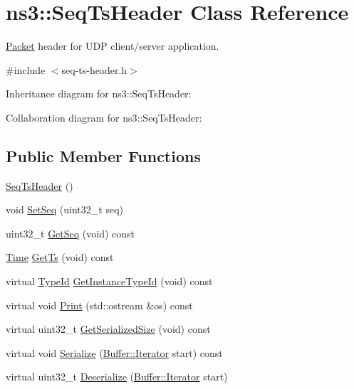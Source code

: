 \hypertarget{classns3_1_1SeqTsHeader}{}\section{ns3\+:\+:Seq\+Ts\+Header Class Reference}
\label{classns3_1_1SeqTsHeader}


\hyperlink{classns3_1_1Packet}{Packet} header for U\+DP client/server application.  




{\ttfamily \#include $<$seq-\/ts-\/header.\+h$>$}



Inheritance diagram for ns3\+:\+:Seq\+Ts\+Header\+:


Collaboration diagram for ns3\+:\+:Seq\+Ts\+Header\+:
\subsection*{Public Member Functions}
\begin{DoxyCompactItemize}
\item 
\hyperlink{classns3_1_1SeqTsHeader_a723832aa029ecef5eb89e316c8a90f3e}{Seq\+Ts\+Header} ()
\item 
void \hyperlink{classns3_1_1SeqTsHeader_a75c153fa59e4f93b1015d1176e6ec01e}{Set\+Seq} (uint32\+\_\+t seq)
\item 
uint32\+\_\+t \hyperlink{classns3_1_1SeqTsHeader_a9ee81d0e571a6b94da1b5026b498850e}{Get\+Seq} (void) const 
\item 
\hyperlink{classns3_1_1Time}{Time} \hyperlink{classns3_1_1SeqTsHeader_adce83d0ce48fcf1c35b587631471b162}{Get\+Ts} (void) const 
\item 
virtual \hyperlink{classns3_1_1TypeId}{Type\+Id} \hyperlink{classns3_1_1SeqTsHeader_a9f02ad9942f039be0857dff3c11d75fd}{Get\+Instance\+Type\+Id} (void) const 
\item 
virtual void \hyperlink{classns3_1_1SeqTsHeader_a4a0dbf841eadb346d436ef57c28a4636}{Print} (std\+::ostream \&os) const 
\item 
virtual uint32\+\_\+t \hyperlink{classns3_1_1SeqTsHeader_aab4b938a19cc44e52b0e8390078b0b20}{Get\+Serialized\+Size} (void) const 
\item 
virtual void \hyperlink{classns3_1_1SeqTsHeader_a94322a720ef62390b8a3b9dd557f0104}{Serialize} (\hyperlink{classns3_1_1Buffer_1_1Iterator}{Buffer\+::\+Iterator} start) const 
\item 
virtual uint32\+\_\+t \hyperlink{classns3_1_1SeqTsHeader_a55ebbed99d0f5ef379248bdca5849476}{Deserialize} (\hyperlink{classns3_1_1Buffer_1_1Iterator}{Buffer\+::\+Iterator} start)
\end{DoxyCompactItemize}
